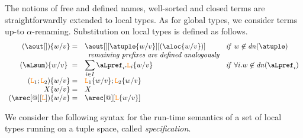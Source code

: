 The notions of free and defined names, well-sorted and closed terms are straightforwardly 
extended to local types. As for global types, we consider terms up-to $\alpha$-renaming. 
%
%
%
Substitution on local types is defined as follows. 
\[
\begin{array}{rl@{\hspace{1cm}}l}
  (\aout[]) \sust v w  = &  \aout[][\atuple\sust v w][(\aloc\sust v w)] &  {\it if}\  w\not\in\dn\atuple
  \\
  \multicolumn{3}{c}{\textit{remaining prefixes are defined analogously}}
  \\
   (\aLsum)\sust v w  = & \displaystyle{\sum_{i\in I} {{\aLpref_{i}.\aL_{i}}\sust v w}}
   &  {\it if}\  \forall i. w\not\in\dn{\aLpref_i}
  \\
  (\aL_1;\aL_2)\sust v w  = &  \aL_1\sust v w;  \aL_2\sust v w 
  \\
  X\sust v w  = & X 
  \\
  (\arec[@][\aL])\sust v w  = & \arec[@][\aL\sust v w]
\end{array}
\]
%
%
%
%
%

We consider the following syntax for the run-time semantics of a set of local types running on a 
tuple space, called {\em specification}.

